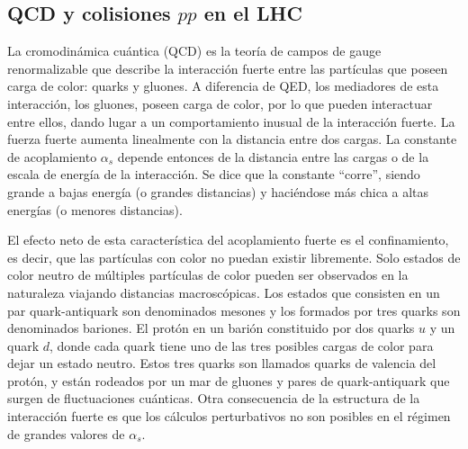 \subsection{QCD y colisiones $pp$ en el LHC}

La cromodinámica cuántica (QCD) \cite{Ellis:1991qj} es la teoría de campos de gauge
renormalizable que describe la interacción fuerte entre las partículas que
poseen carga de color: quarks y gluones. A diferencia de QED, los mediadores
de esta interacción, los gluones, poseen carga de color, por lo que
pueden interactuar entre ellos, dando lugar a un comportamiento inusual de la
interacción fuerte. La fuerza fuerte aumenta linealmente con la distancia entre
dos cargas. La constante de acoplamiento $\alpha_s$ depende entonces de
la distancia entre las cargas o de la escala de energía de la interacción. Se
dice que la constante ``corre'', siendo grande a bajas energía (o grandes
distancias) y haciéndose más chica a altas energías (o menores distancias).

El efecto neto de esta característica del acoplamiento fuerte es el
confinamiento, es decir, que las partículas con color no puedan existir
libremente. Solo estados de color neutro de múltiples partículas de color pueden
ser observados en la naturaleza viajando distancias macroscópicas. Los estados
que consisten en un par quark-antiquark son denominados mesones y  los
 formados por tres quarks son denominados bariones. El protón en un
barión constituido por dos quarks $u$ y un quark $d$, donde cada quark tiene uno de
las tres posibles cargas de color para dejar un estado neutro. Estos tres quarks
son llamados quarks de valencia del protón, y están rodeados por un mar
de gluones y pares de quark-antiquark que surgen de fluctuaciones cuánticas.
Otra consecuencia de la estructura de la interacción fuerte es que los cálculos
perturbativos no son posibles en el régimen de grandes valores de $\alpha_s$.

